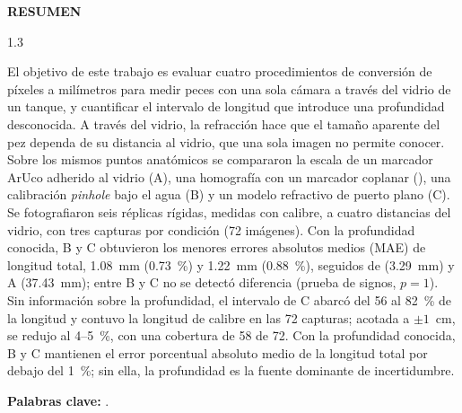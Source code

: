 \thispagestyle{plain}
\begin{center}
  {\Large\bfseries RESUMEN}
\end{center}

\vspace{0.8\baselineskip}

\begin{spacing}{1.3}
    \justifying
    \setlength{\parskip}{6pt plus 1pt minus 1pt}
    \setlength{\parindent}{0pt}

El objetivo de este trabajo es evaluar cuatro procedimientos de conversión de píxeles a milímetros para medir peces con una sola cámara a través del vidrio de un tanque, y cuantificar el intervalo de longitud que introduce una profundidad desconocida. A través del vidrio, la refracción hace que el tamaño aparente del pez dependa de su distancia al vidrio, que una sola imagen no permite conocer. Sobre los mismos puntos anatómicos se compararon la escala de un marcador ArUco adherido al vidrio (A), una homografía con un marcador coplanar (\Aprime), una calibración \emph{pinhole} bajo el agua (B) y un modelo refractivo de puerto plano (C). Se fotografiaron seis réplicas rígidas, medidas con calibre, a cuatro distancias del vidrio, con tres capturas por condición (72 imágenes). Con la profundidad conocida, B y C obtuvieron los menores errores absolutos medios (MAE) de longitud total, \SI{1,08}{mm} (\SI{0,73}{\percent}) y \SI{1,22}{mm} (\SI{0,88}{\percent}), seguidos de \Aprime{} (\SI{3,29}{mm}) y A (\SI{37,43}{mm}); entre B y C no se detectó diferencia (prueba de signos, $p = 1$). Sin información sobre la profundidad, el intervalo de C abarcó del 56 al 82~\% de la longitud y contuvo la longitud de calibre en las 72 capturas; acotada a $\pm 1$~cm, se redujo al 4--5~\%, con una cobertura de 58 de 72. Con la profundidad conocida, B y C mantienen el error porcentual absoluto medio de la longitud total por debajo del 1~\%; sin ella, la profundidad es la fuente dominante de incertidumbre.

    \textbf{Palabras clave:} \PalabrasClave.
\end{spacing}
\clearpage
